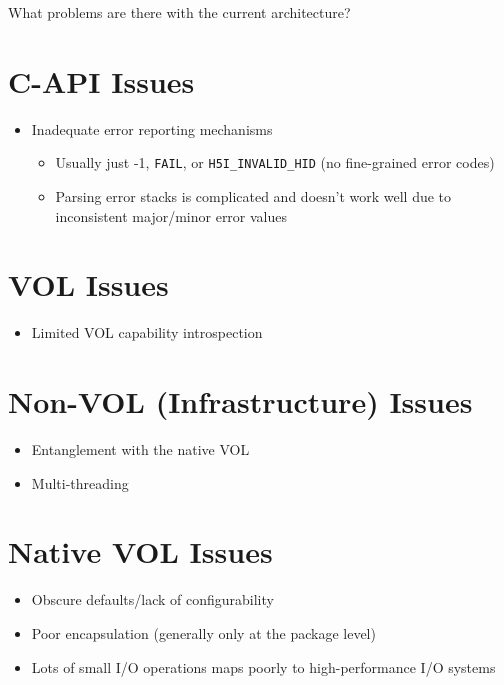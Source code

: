 



What problems are there with the current architecture?

\section{C-API Issues}

\begin{itemize}
    \item Inadequate error reporting mechanisms
    \begin{itemize}
        \item Usually just -1, \texttt{FAIL}, or \texttt{H5I\_INVALID\_HID} (no fine-grained error codes)
        \item Parsing error stacks is complicated and doesn't work well due to inconsistent major/minor error values
    \end{itemize}
\end{itemize}

\section{VOL Issues}

\begin{itemize}
    \item Limited VOL capability introspection
\end{itemize}

\section{Non-VOL (Infrastructure) Issues}

\begin{itemize}
    \item Entanglement with the native VOL
    \item Multi-threading
\end{itemize}

\section{Native VOL Issues}

\begin{itemize}
    \item Obscure defaults/lack of configurability
    \item Poor encapsulation (generally only at the package level)
    \item Lots of small I/O operations maps poorly to high-performance I/O systems
\end{itemize}